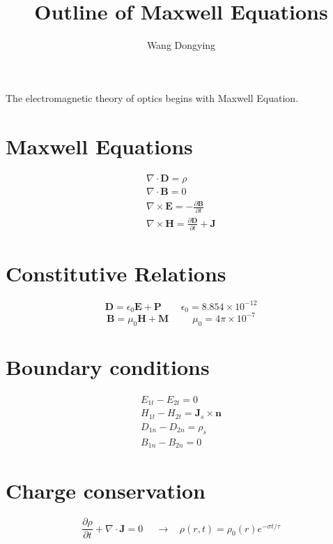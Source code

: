 \documentclass{article}
\author{Wang Dongying}
\title{Outline of Maxwell Equations}
\begin{document}
\maketitle

	The electromagnetic theory of optics begins with Maxwell Equation.

	\section{Maxwell Equations}

		\begin{equation}
		\begin{aligned}
			\nabla\cdot\bm{D} = \rho\\
			\nabla\cdot\bm{B} = 0\\
			\nabla\times\bm{E} = -\frac{\partial\bm{B}}{\partial t}\\
			\nabla\times\bm{H} = \frac{\partial\bm{D}}{\partial t} + \bm{J}
		\end{aligned}
		\end{equation}

	\section{Constitutive Relations}

		$$\bm{D} = \epsilon_{0}\bm{E} + \bm{P} \ \ \ \ \ \ \ \ \ \epsilon_{0} = 8.854 \times 10^{-12}$$
		$$\bm{B} = \mu_{0}\bm{H} + \bm{M} \ \ \ \ \ \ \ \ \ \ \ \mu_{0} = 4\pi \times 10^{-7}$$

	\section{Boundary conditions}

		\begin{equation}
		\begin{aligned}
			E_{1t} - E_{2t} = 0\\
			H_{1t} - H_{2t} = \bm{J}_{s} \times \bm{n}\\
			D_{1n} - D_{2n} = \rho_{s}\\
			B_{1n} - B_{2n} = 0
		\end{aligned}
		\end{equation}

	\section{Charge conservation}

		$$\frac{\partial \rho}{\partial t} + \nabla\cdot\bm{J} = 0\ \ \ \ \ \ \to \ \ \ \ \rho(r,t) = \rho_{0}(r)e^{-\sigma t/\tau}$$
\end{document}
